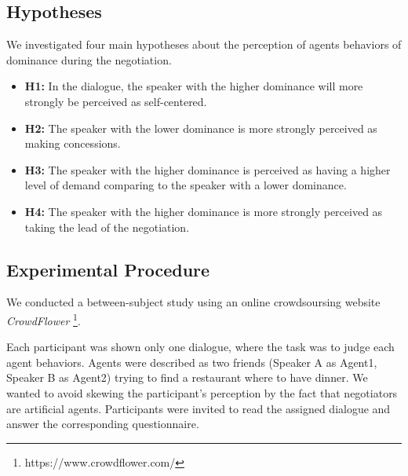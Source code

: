 \documentclass{llncs}
\begin{document}
		
				
				
						
				\subsection{Hypotheses}
				 We investigated four main hypotheses about the perception of agents behaviors of dominance during the negotiation. 
				 \begin{itemize}
				 	\item  \textbf{H1:} In the dialogue, the speaker with the higher dominance will more strongly be perceived as self-centered.  
				 	
				 	\item \textbf{H2:} The speaker with the lower dominance is more strongly perceived as making concessions.
				 	
				 	\item \textbf{H3:} The speaker with the higher dominance is perceived as having a higher level of demand comparing to the speaker with a lower dominance.
				 	
				 	\item \textbf{H4:} The speaker with the higher dominance is more strongly perceived as taking the lead of the negotiation.
				 	
				 \end{itemize}
						
				\subsection{Experimental Procedure}
				
				We conducted a between-subject study using an online crowdsoursing website \emph{CrowdFlower} \footnote{https://www.crowdflower.com/}. 
				
				
				Each participant was shown only one dialogue, where the task was to judge each agent behaviors. Agents were described as two friends (Speaker A as Agent1, Speaker B as Agent2) trying to find a restaurant where to have dinner. We wanted to avoid skewing the participant's perception by the fact that negotiators are artificial agents. Participants were invited to read the assigned dialogue and answer the corresponding questionnaire. 
				
\end{document}
